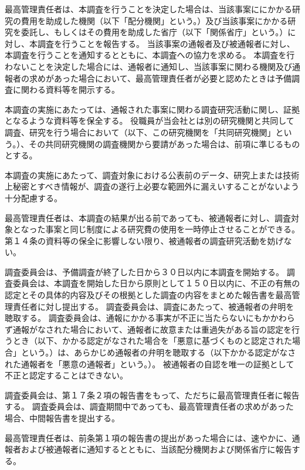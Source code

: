 \documentclass[10pt,a4paper,uplatex]{jsarticle}
\begin{document}
最高管理責任者は、本調査を行うことを決定した場合は、当該事案ににかかる研究の費用を助成した機関（以下「配分機関」という。）及び当該事案にかかる研究を委託し、もしくはその費用を助成した省庁（以下「関係省庁」という。）に対し、本調査を行うことを報告する。
\term 当該事案の通報者及び被通報者に対し、本調査を行うことを通知するとともに、本調査への協力を求める。
\term 本調査を行わないことを決定した場合には、通報者に通知し、当該事案に関わる機関及び通報者の求めがあった場合において、最高管理責任者が必要と認めたときは予備調査に関わる資料等を開示する。

本調査の実施にあたっては、通報された事案に関わる調査研究活動に関し、証拠となるような資料等を保全する。
\term 役職員が当会社とは別の研究機関と共同して調査、研究を行う場合において（以下、この研究機関を「共同研究機関」という。）、その共同研究機関の調査機関から要請があった場合は、前項に準じるものとする。

本調査の実施にあたって、調査対象における公表前のデータ、研究上または技術上秘密とすべき情報が、調査の遂行上必要な範囲外に漏えいすることがないよう十分配慮する。

最高管理責任者は、本調査の結果が出る前であっても、被通報者に対し、調査対象となった事案と同じ制度による研究費の使用を一時停止させることができる。
\term 第１４条の資料等の保全に影響しない限り、被通報者の調査研究活動を妨げない。

調査委員会は、予備調査が終了した日から３０日以内に本調査を開始する。
\term 調査委員会は、本調査を開始した日から原則として１５０日以内に、不正の有無の認定とその具体的内容及びその根拠とした調査の内容をまとめた報告書を最高管理責任者に対し提出する。
\term 調査委員会は、調査にあたって、被通報者の弁明を聴取する。
\term 調査委員会は、通報にかかる事実が不正に当たらないにもかかわらず通報がなされた場合において、通報者に故意または重過失がある旨の認定を行うとき（以下、かかる認定がなされた場合を「悪意に基づくものと認定された場合」という。）は、あらかじめ通報者の弁明を聴取する（以下かかる認定がなされた通報者を「悪意の通報者」という。）。
\term 被通報者の自認を唯一の証拠として不正と認定することはできない。

調査委員会は、第１７条２項の報告書をもって、ただちに最高管理責任者に報告する。
\term 調査委員会は、調査期間中であっても、最高管理責任者の求めがあった場合、中間報告書を提出する。

最高管理責任者は、前条第１項の報告書の提出があった場合には、速やかに、通報者および被通報者に通知するとともに、当該配分機関および関係省庁に報告する。
\end{document}
